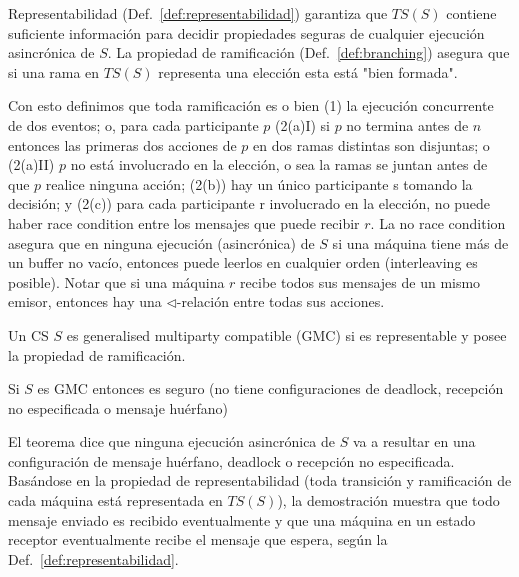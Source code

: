 Representabilidad (Def.~\ref{def:representabilidad}) garantiza que $TS(S)$ contiene suficiente información para decidir propiedades seguras de cualquier ejecución asincrónica de $S$. La propiedad de ramificación (Def.~\ref{def:branching}) asegura que si una rama en $TS(S)$ representa una elección esta está "bien formada".
 
Con esto definimos que toda ramificación es o bien (1) la ejecución concurrente de dos eventos; o, para cada participante $p$ (2(a)I) si $p$ no termina antes de $n$ entonces las primeras dos acciones de $p$ en dos ramas distintas son disjuntas; o (2(a)II) $p$ no está involucrado en la elección, o sea la ramas se juntan antes de que $p$ realice ninguna acción; (2(b)) hay un único participante s tomando la decisión; y (2(c)) para cada participante r involucrado en la elección, no puede haber race condition entre los mensajes que puede recibir $r$. La no race condition asegura que en ninguna ejecución (asincrónica) de $S$ si una máquina tiene más de un buffer no vacío, entonces puede leerlos en cualquier orden (interleaving es posible). Notar que si una máquina $r$ recibe todos sus mensajes de un mismo emisor, entonces hay una $\triangleleft$-relación entre todas sus acciones.

\begin{definition} Un CS $S$ es generalised multiparty compatible (GMC) si es representable y posee la propiedad de ramificación. 
\end{definition}

\begin{theorem}[Solvencia] Si $S$ es GMC entonces es seguro (no tiene configuraciones de deadlock, recepción no especificada o mensaje huérfano)
\end{theorem}

El teorema dice que ninguna ejecución asincrónica de $S$ va a resultar en una configuración de mensaje huérfano, deadlock o recepción no especificada. Basándose en la propiedad de representabilidad (toda transición y ramificación de cada máquina está representada en $TS(S)$), la demostración \cite{lange:popl15} muestra que todo mensaje enviado es recibido eventualmente y que una máquina en un estado receptor eventualmente recibe el mensaje que espera, según la Def.~\ref{def:representabilidad}.


